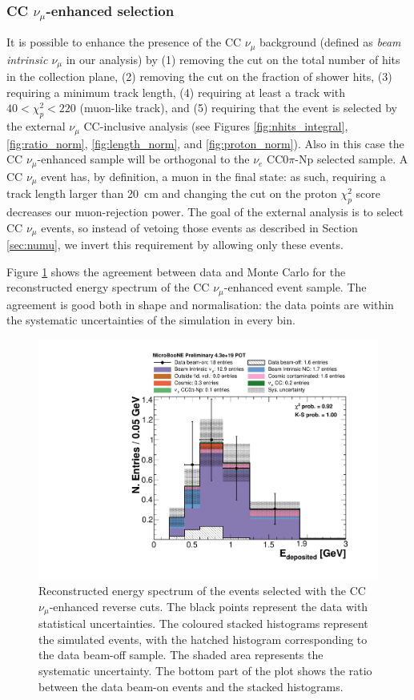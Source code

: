 \subsubsection{CC \texorpdfstring{$\nu_{\mu}$}{numu}-enhanced selection}
It is possible to enhance the presence of the CC $\nu_{\mu}$ background (defined as \emph{beam intrinsic $\nu_{\mu}$} in our analysis) by (1) removing the cut on the total number of hits in the collection plane, (2) removing the cut on the fraction of shower hits, (3) requiring a minimum track length, (4) requiring at least a track with $40 < \chi_p^{2} < 220$ (muon-like track), and (5) requiring that the event is selected by the external $\nu_{\mu}$ CC-inclusive analysis \cite{ubxsec} (see Figures \ref{fig:nhits_integral}, \ref{fig:ratio_norm}, \ref{fig:length_norm}, and \ref{fig:proton_norm}). Also in this case the CC $\nu_{\mu}$-enhanced sample will be orthogonal to the $\nu_{e}$ CC0$\pi$-Np selected sample.
A CC $\nu_{\mu}$ event has, by definition, a muon in the final state: as such, requiring a track length larger than 20~cm and changing the cut on the proton $\chi^2_p$ score decreases our muon-rejection power. The goal of the external analysis is to select CC $\nu_{\mu}$ events, so instead of vetoing those events as described in Section \ref{sec:numu}, we invert this requirement by allowing only these events.

Figure \ref{fig:numu_inverted} shows the agreement between data and Monte Carlo for the reconstructed energy spectrum of the CC $\nu_{\mu}$-enhanced event sample.
The agreement is good both in shape and normalisation: the data points are within the systematic uncertainties of the simulation in every bin.

\begin{figure}[htbp]
\centering
  \includegraphics[width=0.7\linewidth]{figures/numu_reco.pdf}
  \caption{Reconstructed energy spectrum of the events selected with the CC~$\nu_{\mu}$-enhanced reverse cuts. The black points represent the data with statistical uncertainties. The coloured stacked histograms represent the simulated events, with the hatched histogram corresponding to the data beam-off sample. The shaded area represents the systematic uncertainty. The bottom part of the plot shows the ratio between the data beam-on events and the stacked histograms.}\label{fig:numu_inverted}
\end{figure}

